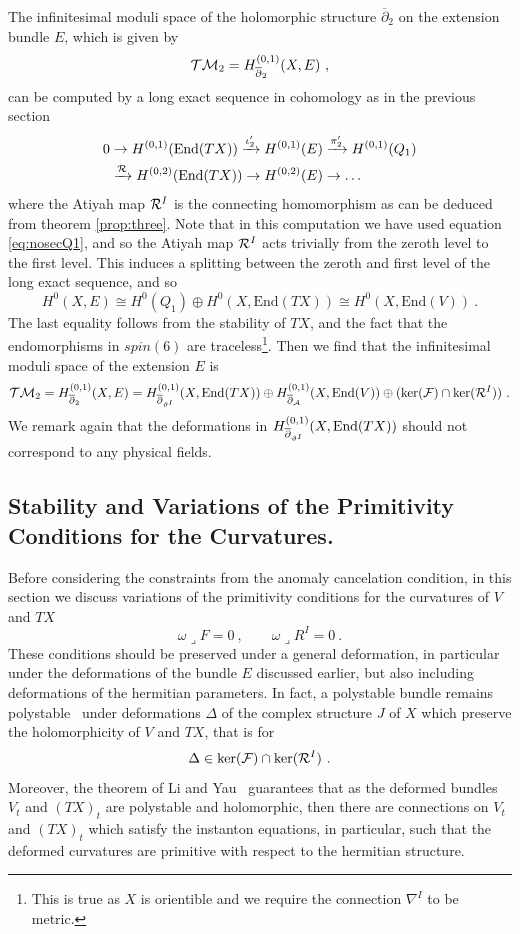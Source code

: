 \documentclass[12pt,a4paper]{article}
\def\bar#1{\overline{#1}}
\def\End{\textrm{End}}
\def\ker{\textrm{ker}}
\def\bp{\bar{\partial}}
\theoremstyle{definition}
\begin{document}
The infinitesimal moduli space of the holomorphic structure $\bp_2$ on the extension bundle $E$, which is given by
\[{\cal TM}_2 = H^{(0,1)}_{\bp_2}(X, E)~,\]
can be computed by a long exact sequence in cohomology as in the previous section
\begin{align*}
0 &\rightarrow H^{(0,1)}(\End(TX)) \xrightarrow{\iota_2'} H^{(0,1)}(E) \xrightarrow{\pi_2'} H^{(0,1)}(Q_1) \\
&\xrightarrow{\cal R} H^{(0,2)}(\End(TX)) \rightarrow H^{(0,2)}(E) \rightarrow \ldots
\end{align*}
where the Atiyah map ${\cal R}^I$ is the connecting homomorphism as can be deduced from theorem \ref{prop:three}. Note that in this computation we have used equation \eqref{eq:nosecQ1}, and so the Atiyah map ${\cal R}^I$ acts trivially from the zeroth level to the first level. This induces a splitting between the zeroth and first level of the long exact sequence, and so
\begin{equation}
 H^0(X, E) \cong H^0(Q_1)\oplus H^0(X, \End(TX))\cong H^0(X, \End(V))~.\label{eq:nosecQ2} 
 \end{equation}
The last equality follows from the stability of $TX$, and the fact that the endomorphisms in $spin(6)$ are traceless\footnote{This is true as $X$ is orientible and we require the connection $\nabla^I$ to be metric.}.
Then we find that the infinitesimal moduli space of the extension $E$ is
\[{\cal TM}_2= H_{\bp_2}^{(0,1)}(X, E) =
H_{\bp_{\vartheta^I}}^{(0,1)}(X,{\rm End}(TX))\oplus
H_{\bp_{\cal A}}^{(0,1)}(X,\End(V))\oplus (\ker({\cal F})\cap\ker({\cal R}^I)) 
~.\]
We remark again that the deformations in $H_{\bp_{\vartheta^I}}^{(0,1)}(X,{\rm End}(TX))$ should not correspond to any physical fields.

\subsection{Stability and Variations of the Primitivity Conditions for the Curvatures.}
\label{subsec:Primitive}

Before considering the constraints from the anomaly cancelation condition, in this section we discuss variations of the primitivity conditions for the curvatures of $V$ and $TX$
\[ \omega\lrcorner F = 0 ~, \qquad \omega\lrcorner R^I = 0~.\]
These conditions should be preserved under a general deformation, in particular under the deformations of the bundle $E$ discussed earlier, but also including deformations of the hermitian parameters.  In fact,  a polystable bundle remains polystable~\citep{MR2665168} under deformations $\Delta$ of the complex structure $J$ of $X$ which preserve the holomorphicity of $V$ and $TX$, that is for
\[\Delta \in \ker({\cal F})\cap\ker({\cal R}^I)~.\]  
Moreover, the theorem of Li and Yau~\citep{MR915839} guarantees that as the deformed bundles $V_t$ and $(TX)_t$ are polystable and holomorphic, then there are connections on $V_t$ and $(TX)_t$ which satisfy the instanton equations, in particular, such that the deformed curvatures are primitive with respect to the hermitian structure.
\end{document}
